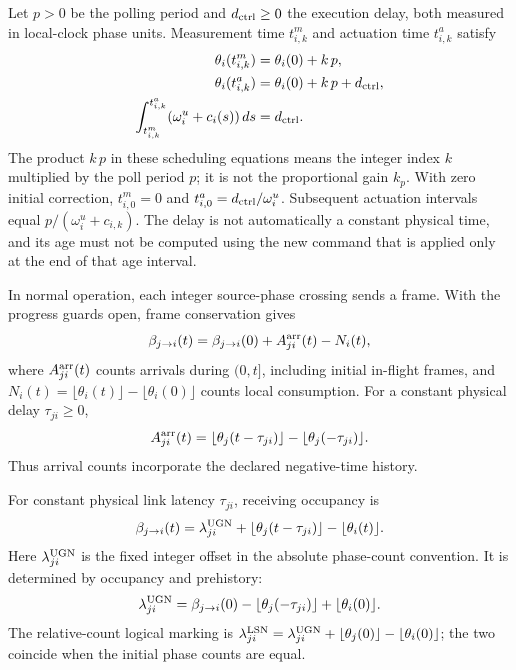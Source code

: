 Let $p>0$ be the polling period and $d_{\rm ctrl}\ge0$ the execution delay,
both measured in local-clock phase units. Measurement time $t^m_{i,k}$
and actuation time $t^a_{i,k}$ satisfy
\begin{align}
 \theta_i(t^m_{i,k})&=\theta_i(0)+k\,p,\nonumber\\
 \theta_i(t^a_{i,k})&=\theta_i(0)+k\,p+d_{\rm ctrl},\nonumber\\
 \int_{t^m_{i,k}}^{t^a_{i,k}}(\omega_i^u+c_i(s))\,ds&=d_{\rm ctrl}.
 \label{detail:eq:fpi_local_schedule}
\end{align}
The product $k\,p$ in these scheduling equations means the integer index
$k$ multiplied by the poll period $p$; it is not the proportional gain
$k_p$. With zero initial correction, $t^m_{i,0}=0$ and
$t^a_{i,0}=d_{\rm ctrl}/\omega_i^u$. Subsequent actuation intervals equal
$p/(\omega_i^u+c_{i,k})$. The delay is not automatically a constant
physical time, and its age must not be computed using the new command
that is applied only at the end of that age interval.

In normal operation, each integer source-phase crossing sends a frame.
With the progress guards open, frame conservation gives
\begin{equation}
 \beta_{j\to i}(t)=\beta_{j\to i}(0)+A^{\rm arr}_{ji}(t)-N_i(t),
 \label{detail:eq:fpi_count_balance}
\end{equation}
where $A^{\rm arr}_{ji}(t)$ counts arrivals during $(0,t]$, including
initial in-flight frames, and
$N_i(t)=\lfloor\theta_i(t)\rfloor-\lfloor\theta_i(0)\rfloor$ counts
local consumption. For a constant physical delay $\tau_{ji}\ge0$,
\begin{equation}
 A^{\rm arr}_{ji}(t)=\lfloor\theta_j(t-\tau_{ji})\rfloor
                  -\lfloor\theta_j(-\tau_{ji})\rfloor.
 \label{detail:eq:fpi_fixed_delay_arrivals}
\end{equation}
Thus arrival counts incorporate the declared negative-time history.

For constant physical link latency $\tau_{ji}$, receiving occupancy is
\begin{equation}
 \beta_{j\to i}(t)=\lambda^{\rm UGN}_{ji}
 +\lfloor\theta_j(t-\tau_{ji})\rfloor-\lfloor\theta_i(t)\rfloor.
 \label{detail:eq:fpd_continuous_fifo}
\end{equation}
Here $\lambda^{\rm UGN}_{ji}$ is the fixed integer offset in the absolute
phase-count convention. It is determined by occupancy and prehistory:
\begin{equation}
 \lambda^{\rm UGN}_{ji}=\beta_{j\to i}(0)
 -\lfloor\theta_j(-\tau_{ji})\rfloor+\lfloor\theta_i(0)\rfloor.
 \label{detail:eq:fpd_ugn_init}
\end{equation}
The relative-count logical marking is
$\lambda^{\rm LSN}_{ji}=\lambda^{\rm UGN}_{ji}
+\lfloor\theta_j(0)\rfloor-\lfloor\theta_i(0)\rfloor$;
the two coincide when the initial phase counts are equal.

